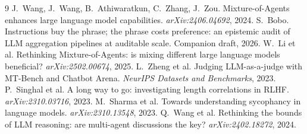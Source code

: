 \documentclass[11pt]{article}
\begin{document}
\begin{thebibliography}{9}
 J.~Wang, J.~Wang, B.~Athiwaratkun, C.~Zhang,
J.~Zou. Mixture-of-Agents enhances large language model capabilities.
\emph{arXiv:2406.04692}, 2024.
 S.~Bobo. Instructions buy the phrase; the
phrase costs preference: an epistemic audit of LLM aggregation
pipelines at auditable scale. Companion draft, 2026.
 W.~Li et al. Rethinking Mixture-of-Agents: is
mixing different large language models beneficial?
\emph{arXiv:2502.00674}, 2025.
 L.~Zheng et al. Judging LLM-as-a-judge with
MT-Bench and Chatbot Arena. \emph{NeurIPS Datasets and Benchmarks},
2023.
 P.~Singhal et al. A long way to go:
investigating length correlations in RLHF. \emph{arXiv:2310.03716},
2023.
 M.~Sharma et al. Towards understanding
sycophancy in language models. \emph{arXiv:2310.13548}, 2023.
 Q.~Wang et al. Rethinking the bounds of LLM
reasoning: are multi-agent discussions the key?
\emph{arXiv:2402.18272}, 2024.
\end{thebibliography}
\end{document}
